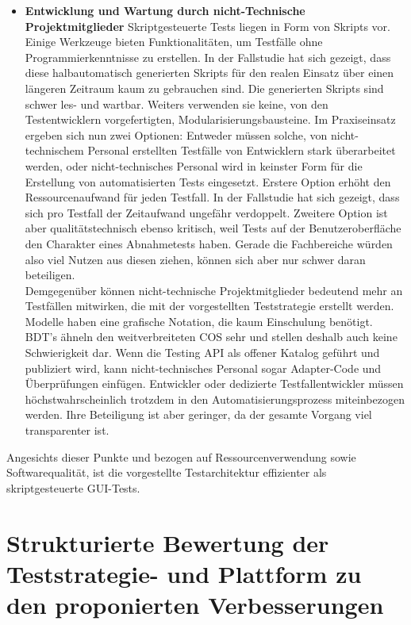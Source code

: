 \begin{itemize}
\item \textbf{Entwicklung und Wartung durch nicht-Technische Projektmitglieder} Skriptgesteuerte Tests liegen in Form von Skripts vor. Einige Werkzeuge bieten Funktionalitäten, um Testfälle ohne Programmierkenntnisse zu erstellen. In der Fallstudie hat sich gezeigt, dass diese halbautomatisch generierten Skripts für den realen Einsatz über einen längeren Zeitraum kaum zu gebrauchen sind. Die generierten Skripts sind schwer les- und wartbar. Weiters verwenden sie keine, von den Testentwicklern vorgefertigten, Modularisierungsbausteine. Im Praxiseinsatz ergeben sich nun zwei Optionen: Entweder müssen solche, von nicht-technischem Personal erstellten Testfälle von Entwicklern stark überarbeitet werden, oder nicht-technisches Personal wird in keinster Form für die Erstellung von automatisierten Tests eingesetzt. Erstere Option erhöht den Ressourcenaufwand für jeden Testfall. In der Fallstudie hat sich gezeigt, dass sich pro Testfall der Zeitaufwand ungefähr verdoppelt. Zweitere Option ist aber qualitätstechnisch ebenso kritisch, weil Tests auf der Benutzeroberfläche den Charakter eines Abnahmetests haben. Gerade die Fachbereiche würden also viel Nutzen aus diesen ziehen, können sich aber nur schwer daran beteiligen.\\
Demgegenüber können nicht-technische Projektmitglieder bedeutend mehr an Testfällen mitwirken, die mit der vorgestellten Teststrategie erstellt werden. Modelle haben eine grafische Notation, die kaum Einschulung benötigt. \Gls{BDT}'s ähneln den weitverbreiteten \Gls{COS} sehr und stellen deshalb auch keine Schwierigkeit dar. Wenn die Testing API als offener Katalog geführt und publiziert wird, kann nicht-technisches Personal sogar Adapter-Code und Überprüfungen einfügen. Entwickler oder dedizierte Testfallentwickler müssen höchstwahrscheinlich trotzdem in den Automatisierungsprozess miteinbezogen werden. Ihre Beteiligung ist aber geringer, da der gesamte Vorgang viel transparenter ist.
\end{itemize}

Angesichts dieser Punkte und bezogen auf Ressourcenverwendung sowie Softwarequalität, ist die vorgestellte Testarchitektur effizienter als skriptgesteuerte GUI-Tests.

\section[Bewertung zu den proponierten Verbesserungen]{Strukturierte Bewertung der Teststrategie- und Plattform zu den proponierten Verbesserungen}

